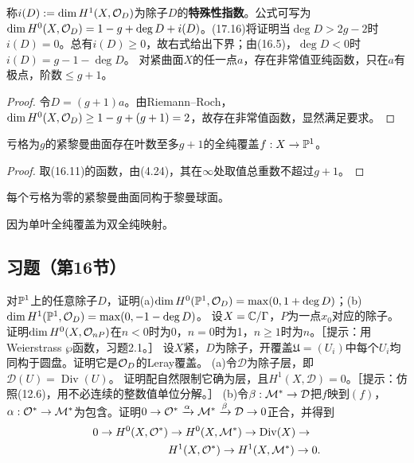 称$i(D):=\dim H^1(X,\mathcal O_D)$为除子$D$的\textbf{特殊性指数}。公式可写为$\dim H^0(X,\mathcal O_D)=1-g+\deg D+i(D)$。(17.16)将证明当$\deg D>2g-2$时$i(D)=0$。总有$i(D)\ge0$，故右式给出下界；由(16.5)，$\deg D<0$时$i(D)=g-1-\deg D$。
对紧曲面$X$的任一点$a$，存在非常值亚纯函数，只在$a$有极点，阶数$\le g+1$。
\begin{proof}
令$D=(g+1)a$。由Riemann--Roch，$\dim H^0(X,\mathcal O_D)\ge1-g+(g+1)=2$，故存在非常值函数，显然满足要求。
\end{proof}
亏格为$g$的紧黎曼曲面存在叶数至多$g+1$的全纯覆盖$f:X\to\mathbb P^1$。
\begin{proof}取(16.11)的函数，由(4.24)，其在$\infty$处取值总重数不超过$g+1$。\end{proof}
每个亏格为零的紧黎曼曲面同构于黎曼球面。

因为单叶全纯覆盖为双全纯映射。
\subsection*{习题（第16节）}
对$\mathbb P^1$上的任意除子$D$，证明(a)$\dim H^0(\mathbb P^1,\mathcal O_D)=\max(0,1+\deg D)$；(b)$\dim H^1(\mathbb P^1,\mathcal O_D)=\max(0,-1-\deg D)$。
设$X=\mathbb C/\Gamma$，$P$为一点$x_0$对应的除子。证明$\dim H^0(X,\mathcal O_{nP})$在$n<0$时为0，$n=0$时为1，$n\ge1$时为$n$。［提示：用Weierstrass $\wp$函数，习题2.1。］
设$X$紧，$D$为除子，开覆盖$\mathfrak U=(U_i)$中每个$U_i$均同构于圆盘。证明它是$\mathcal O_D$的Leray覆盖。
(a)令$\mathcal D$为除子层，即$\mathcal D(U)=\operatorname{Div}(U)$。
证明配自然限制它确为层，且$H^1(X,\mathcal D)=0$。［提示：仿照(12.6)，用不必连续的整数值单位分解。］
(b)令$\beta:\mathcal M^*\to\mathcal D$把$f$映到$(f)$，$\alpha:\mathcal O^*\to\mathcal M^*$为包含。证明$0\to\mathcal O^*\xrightarrow\alpha\mathcal M^*\xrightarrow\beta\mathcal D\to0$正合，并得到
\[
\begin{aligned}0\to H^0(X,\mathcal O^*)&\to H^0(X,\mathcal M^*)\to\operatorname{Div}(X)\to\\&H^1(X,\mathcal O^*)\to H^1(X,\mathcal M^*)\to0.
\end{aligned}
\]
